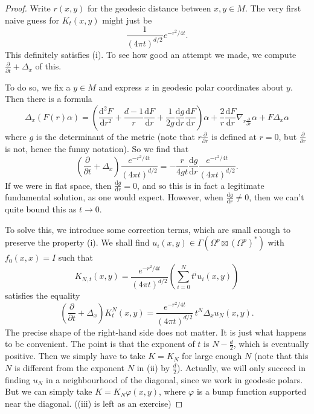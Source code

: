 \documentclass{shortart}
\theoremstyle{definition}
\renewcommand\d{\mathrm{d}}
\begin{document}
\begin{proof}
  Write $r(x, y)$ for the geodesic distance between $x, y \in M$. The very first naive guess for $K_t(x, y)$ might just be
  \[
    \frac{1}{(4\pi t)^{d/2}} e^{-r^2/4t}.
  \]
  This definitely satisfies (i). To see how good an attempt we made, we compute $\frac{\partial}{\partial t} + \Delta_x$ of this.

  To do so, we fix a $y \in M$ and express $x$ in geodesic polar coordinates about $y$. Then there is a formula
  \[
    \Delta_x (F(r) \alpha) = \left(\frac{\d^2 F}{\d r^2} + \frac{d - 1}{r} \frac{\d F}{\d r} + \frac{1}{2g} \frac{\d g}{\d r} \frac{\d F}{\d r}\right)\alpha + \frac{2}{r} \frac{\d F}{\d r} \nabla_{r \frac{\partial}{\partial r}} \alpha + F \Delta_x \alpha
  \]
  where $g$ is the determinant of the metric (note that $r\frac{\partial}{\partial r}$ is defined at $r = 0$, but $\frac{\partial}{\partial r}$ is not, hence the funny notation). So we find that
  \[
    \left(\frac{\partial}{\partial t} + \Delta_x\right) \frac{e^{-r^2/4t}}{(4\pi t)^{d/2}} = -\frac{r}{4g t} \frac{\d g}{\d r} \frac{e^{-r^2/4t}}{(4\pi t)^{d/2}}.
  \]
  If we were in flat space, then $\frac{\d g}{\d r} = 0$, and so this is in fact a legitimate fundamental solution, as one would expect. However, when $\frac{\d g}{\d r} \not= 0$, then we can't quite bound this as $t \to 0$.

  To solve this, we introduce some correction terms, which are small enough to preserve the property (i). We shall find $u_i(x, y) \in \Gamma(\Omega^p \boxtimes (\Omega^p)^*)$ with $f_0(x, x) = I$ such that
  \[
    K_{N, t} (x, y) = \frac{e^{-r^2/4t}}{(4\pi t)^{d/2}} \left(\sum_{i = 0}^N t^i u_i(x, y)\right)
  \]
  satisfies the equality
  \[
    \left(\frac{\partial}{\partial t} + \Delta_x\right) K^N_t(x, y) = \frac{e^{-r^2/4t}}{(4\pi t)^{d/2}}\, t^N \Delta_x u_N(x, y).
  \]
  The precise shape of the right-hand side does not matter. It is just what happens to be convenient. The point is that the exponent of $t$ is $N - \frac{d}{2}$, which is eventually positive. Then we simply have to take $K = K_N$ for large enough $N$ (note that this $N$ is different from the exponent $N$ in (ii) by $\frac{d}{2}$). Actually, we will only succeed in finding $u_N$ in a neighbourhood of the diagonal, since we work in geodesic polars. But we can simply take $K = K_N \varphi(x, y)$, where $\varphi$ is a bump function supported near the diagonal. ((iii) is left as an exercise)


\end{proof}
\end{document}
